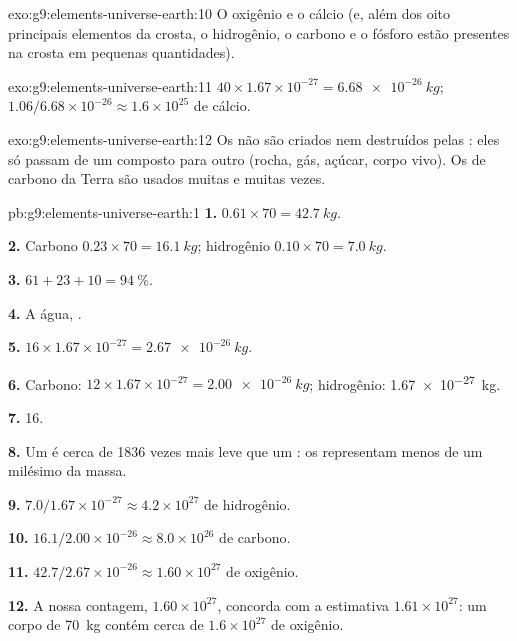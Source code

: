 \begin{solution}{exo:g9:elements-universe-earth:10}
O oxigênio e o cálcio (e, além dos oito principais elementos da crosta,
o hidrogênio, o carbono e o fósforo estão presentes na crosta em
pequenas quantidades).
\end{solution}

\begin{solution}{exo:g9:elements-universe-earth:11}
$40 \times 1.67 \times 10^{-27} = \qty{6.68e-26}{kg}$;
$1.06 / 6.68 \times 10^{-26} \approx 1.6 \times 10^{25}$  de cálcio.
\end{solution}

\begin{solution}{exo:g9:elements-universe-earth:12}
Os  não são criados nem destruídos pelas :
eles só passam de um composto para outro (rocha, gás, açúcar, corpo
vivo). Os  de carbono da Terra são usados muitas e muitas vezes.
\end{solution}

\begin{solution}{pb:g9:elements-universe-earth:1}
\textbf{1.} $0.61 \times 70 = \qty{42.7}{kg}$.

\textbf{2.} Carbono $0.23 \times 70 = \qty{16.1}{kg}$; hidrogênio
$0.10 \times 70 = \qty{7.0}{kg}$.

\textbf{3.} $61 + 23 + 10 = \qty{94}{\percent}$.

\textbf{4.} A água, .

\textbf{5.} $16 \times 1.67 \times 10^{-27} = \qty{2.67e-26}{kg}$.

\textbf{6.} Carbono: $12 \times 1.67 \times 10^{-27} = \qty{2.00e-26}{kg}$;
hidrogênio: \qty{1.67e-27}{kg}.

\textbf{7.} 16.

\textbf{8.} Um  é cerca de 1836 vezes mais leve que um :
os  representam menos de um milésimo da massa.

\textbf{9.} $7.0 / 1.67 \times 10^{-27} \approx 4.2 \times 10^{27}$
 de hidrogênio.

\textbf{10.} $16.1 / 2.00 \times 10^{-26} \approx 8.0 \times 10^{26}$
 de carbono.

\textbf{11.} $42.7 / 2.67 \times 10^{-26} \approx 1.60 \times 10^{27}$
 de oxigênio.

\textbf{12.} A nossa contagem, $1.60 \times 10^{27}$, concorda com a
estimativa $1.61 \times 10^{27}$: um corpo de \qty{70}{kg} contém cerca
de $1.6 \times
10^{27}$  de oxigênio.
\end{solution}
